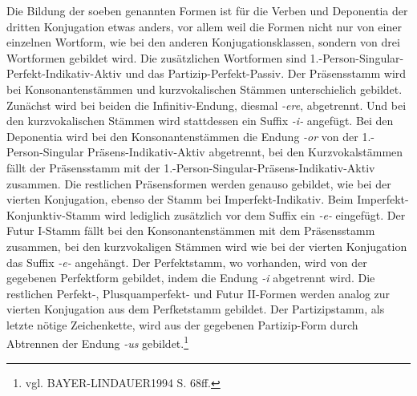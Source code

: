 \documentclass[12pt,abstract=on,titlepage,bibliography=totoc,ngerman,listof=totoc]{scrreprt}
\begin{document}
Die Bildung der soeben genannten Formen ist für die Verben und Deponentia der dritten Konjugation etwas anders, vor allem weil die Formen nicht nur von einer einzelnen Wortform, wie bei den anderen Konjugationsklassen, sondern von drei Wortformen gebildet wird. Die zusätzlichen Wortformen sind 1.-Person-Singular-Perfekt-Indikativ-Aktiv und das Partizip-Perfekt-Passiv. Der Präsensstamm wird bei Konsonantenstämmen und kurzvokalischen Stämmen unterschielich gebildet. Zunächst wird bei beiden die Infinitiv-Endung, diesmal \textit{-ere}, abgetrennt. Und bei den kurzvokalischen Stämmen wird stattdessen ein Suffix \textit{-i-} angefügt. Bei den Deponentia wird bei den Konsonantenstämmen die Endung \textit{-or} von der 1.-Person-Singular Präsens-Indikativ-Aktiv abgetrennt, bei den Kurzvokalstämmen fällt der Präsensstamm mit der 1.-Person-Singular-Präsens-Indikativ-Aktiv zusammen. Die restlichen Präsensformen werden genauso gebildet, wie bei der vierten Konjugation, ebenso der Stamm bei Imperfekt-Indikativ. Beim Imperfekt-Konjunktiv-Stamm wird lediglich zusätzlich vor dem Suffix ein \textit{-e-} eingefügt. Der Futur I-Stamm fällt bei den Konsonantenstämmen mit dem Präsensstamm zusammen, bei den kurzvokaligen Stämmen wird wie bei der vierten Konjugation das Suffix \textit{-e-} angehängt. Der Perfektstamm, wo vorhanden, wird von der gegebenen Perfektform gebildet, indem die Endung \textit{-i} abgetrennt wird. Die restlichen Perfekt-, Plusquamperfekt- und Futur II-Formen werden analog zur vierten Konjugation aus dem Perfketstamm gebildet. Der Partizipstamm, als letzte nötige Zeichenkette, wird aus der gegebenen Partizip-Form durch Abtrennen der Endung \textit{-us} gebildet.\footnote{vgl. BAYER-LINDAUER1994 S. 68ff.} \par
\end{document}

